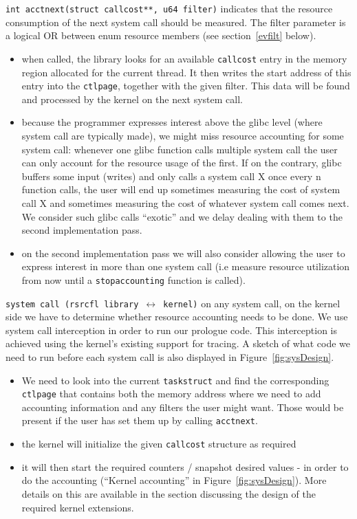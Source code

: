 \documentclass[12pt]{article}
\def\_{\textunderscore\-}
\begin{document}
{\color{blue}\texttt{int acct\_next(struct call\_cost**, u64 filter)}} indicates that the resource consumption of the next system call should be measured. The filter parameter is a logical \textsc{OR} between enum resource members (see section~\ref{evfilt} below).
\begin{itemize}
\item when called, the library looks for an available \texttt{call\_cost} entry in the memory region allocated for the current thread. It then writes the start address of this entry into the \texttt{ctl\_page}, together with the given filter. This data will be found and processed by the kernel on the next system call. 
\item because the programmer expresses interest above the glibc level (where system call are typically made), we might miss resource accounting for some system call: whenever one glibc function calls multiple system call the user can only account for the resource usage of the first. If on the contrary, glibc buffers some input (writes) and only calls a system call X once every n function calls, the user will end up sometimes measuring the cost of system call X and sometimes measuring the cost of whatever system call comes next. We consider such glibc calls “exotic” and we delay dealing with them to the second implementation pass.
\item on the second implementation pass we will also consider allowing the user to express interest in more than one system call (i.e measure resource utilization from now until a \texttt{stop\_accounting} function is called). 
\end{itemize}

{\color{red}\texttt{system call (rsrcfl library $\longleftrightarrow$ kernel)}} on any system call, on the kernel side we have to determine whether resource accounting needs to be done. We use system call interception in order to run our prologue code. This interception is achieved using the kernel's existing support for tracing. A sketch of what code we need to run before each system call is also displayed in Figure~\ref{fig:sysDesign}.
\begin{itemize}
\item We need to look into the current \texttt{task\_struct} and find the corresponding \texttt{ctl\_page} that contains both the memory address where we need to add accounting information and any filters the user might want. Those would be present if the user has set them up by calling \texttt{acct\_next}.
\item the kernel will initialize the given \texttt{call\_cost} structure as required
\item it will then start the required counters / snapshot desired values - in order to do the accounting (``Kernel accounting'' in Figure~\ref{fig:sysDesign}). More details on this are available in the section discussing the design of the required kernel extensions.
\end{itemize}
\end{document}
